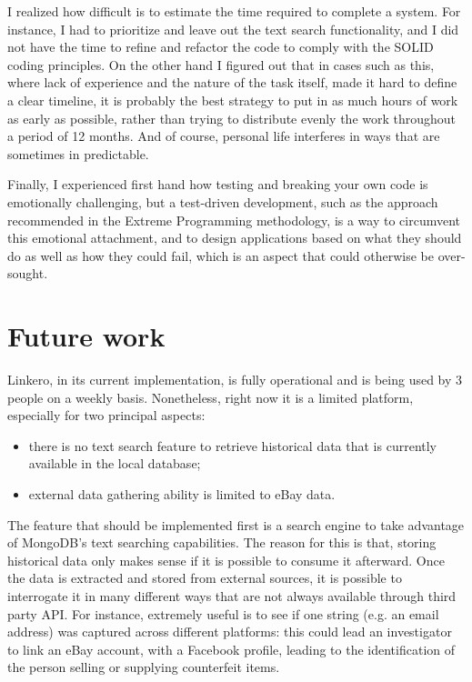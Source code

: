 I realized how difficult is to estimate the time required to complete a system.
For instance, I had to prioritize and leave out the text search functionality,
and I did not have the time to refine and refactor the code to comply with the
SOLID coding principles. On the other hand I figured out that in cases such as
this, where lack of experience and the nature of the task itself, made it hard
to define a clear timeline, it is probably the best strategy to put in as much
hours of work as early as possible, rather than trying to distribute evenly the
work throughout a period of 12 months. And of course, personal life interferes
in ways that are sometimes in predictable.

Finally, I experienced first hand how testing and breaking your own code is
emotionally challenging, but a test-driven development, such as the approach
recommended in the Extreme Programming methodology, is a way to circumvent this
emotional attachment, and to design applications based on what they should do as
well as how they could fail, which is an aspect that could otherwise be
over-sought.


\section{Future work}
Linkero, in its current implementation, is fully operational and is being used
by 3 people on a weekly basis. Nonetheless, right now it is a limited platform,
especially for two principal aspects:
\begin{itemize}
  \item there is no text search feature to retrieve historical data that is
  currently available in the local database;
  \item external data gathering ability is limited to eBay data.
\end{itemize}

The feature that should be implemented first is a search engine to take
advantage of MongoDB's text searching capabilities. The reason for this is that,
storing historical data only makes sense if it is possible to consume it
afterward. Once the data is extracted and stored from external sources, it is
possible to interrogate it in many different ways that are not always available
through third party API. For instance, extremely useful is to see if one string
(e.g. an email address) was captured across different platforms: this could lead
an investigator to link an eBay account, with a Facebook profile, leading to the
identification of the person selling or supplying counterfeit items.

